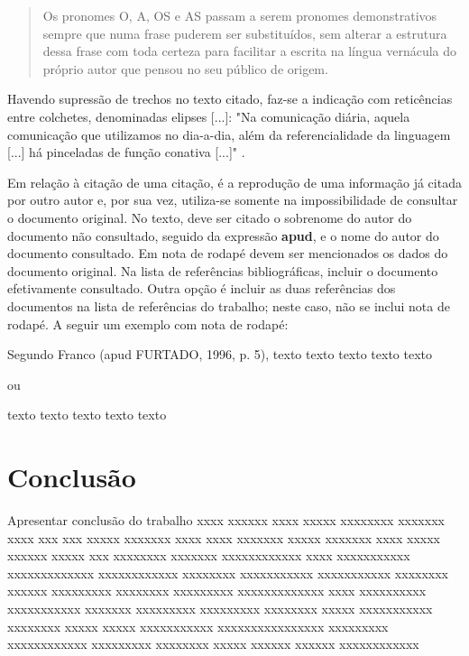 \documentclass[ppgc,diss]{iiufrgs}
\begin{document}
\begin{quote}
    Os pronomes O, A, OS e AS passam a serem pronomes demonstrativos sempre que
    numa frase puderem ser substituídos, sem alterar a estrutura dessa frase
    com toda certeza para facilitar a escrita na língua vernácula do próprio
    autor que pensou no seu público de origem. \cite[p.~19]{simoes}
\end{quote}

Havendo supressão de trechos no texto citado, faz-se a indicação com
reticências entre colchetes, denominadas elipses [...]: "Na comunicação diária,
aquela comunicação que utilizamos no dia-a-dia, além da referencialidade da
linguagem [...] há pinceladas de função conativa [...]" \cite[p.~37]{chalhub}.

Em relação à citação de uma citação, é a reprodução de uma informação já citada
por outro autor e, por sua vez, utiliza-se somente na impossibilidade de
consultar o documento original. No texto, deve ser citado o sobrenome do autor
do documento não consultado, seguido da expressão \textbf{apud}, e o nome do
autor do documento consultado. Em nota de rodapé devem ser mencionados os dados
do documento original. Na lista de referências bibliográficas, incluir o
documento efetivamente consultado. Outra opção é incluir as duas referências
dos documentos na lista de referências do trabalho; neste caso, não se inclui
nota de rodapé. A seguir um exemplo com nota de rodapé:

	Segundo Franco (apud FURTADO, 1996, p. 5), texto texto texto texto texto

ou

	texto texto texto texto texto 


\chapter{Conclusão}
Apresentar conclusão do trabalho xxxx xxxxxx xxxx xxxxx xxxxxxxx xxxxxxx xxxx
xxx xxx xxxxx xxxxxxx xxxx xxxx xxxxxxx xxxxx xxxxxxx xxxx xxxxx xxxxxx xxxxx
xxx xxxxxxxx xxxxxxx xxxxxxxxxxxx xxxx xxxxxxxxxxx xxxxxxxxxxxxx xxxxxxxxxxxx
xxxxxxxx xxxxxxxxxxx xxxxxxxxxxx xxxxxxxx xxxxxx xxxxxxxxx xxxxxxxx xxxxxxxxx
xxxxxxxxxxxxx xxxx xxxxxxxxxx xxxxxxxxxxx xxxxxxx xxxxxxxxx xxxxxxxxx xxxxxxxx
xxxxx xxxxxxxxxxx xxxxxxxx xxxxx xxxxx xxxxxxxxxxx xxxxxxxxxxxxxxxx xxxxxxxxx
xxxxxxxxxxxx xxxxxxxxx xxxxxxxx xxxxx xxxxxx xxxxxx xxxxxxxxxxxx
\end{document}
